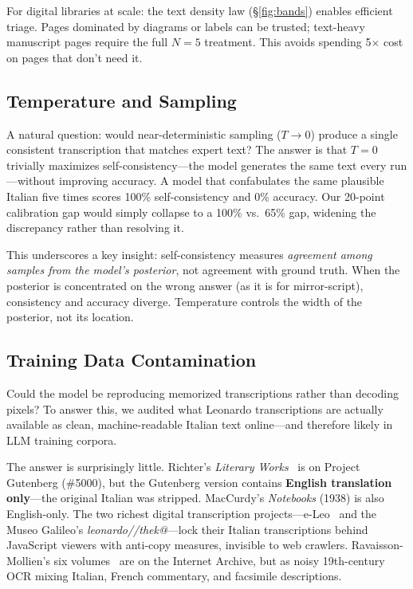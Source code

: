 \documentclass[10pt,twocolumn]{article}
\begin{document}
For digital libraries at scale: the text density law (\S\ref{fig:bands}) enables efficient triage. Pages dominated by diagrams or labels can be trusted; text-heavy manuscript pages require the full $N{=}5$ treatment. This avoids spending 5$\times$ cost on pages that don't need it.

\subsection{Temperature and Sampling}

A natural question: would near-deterministic sampling ($T \to 0$) produce a single consistent transcription that matches expert text? The answer is that $T{=}0$ trivially maximizes self-consistency---the model generates the same text every run---without improving accuracy. A model that confabulates the same plausible Italian five times scores 100\% self-consistency and 0\% accuracy. Our 20-point calibration gap would simply collapse to a 100\% vs.\ 65\% gap, widening the discrepancy rather than resolving it.

This underscores a key insight: self-consistency measures \emph{agreement among samples from the model's posterior}, not agreement with ground truth. When the posterior is concentrated on the wrong answer (as it is for mirror-script), consistency and accuracy diverge. Temperature controls the width of the posterior, not its location.

\subsection{Training Data Contamination}

Could the model be reproducing memorized transcriptions rather than decoding pixels? To answer this, we audited what Leonardo transcriptions are actually available as clean, machine-readable Italian text online---and therefore likely in LLM training corpora.

The answer is surprisingly little. Richter's \emph{Literary Works}~\cite{richter1883} is on Project Gutenberg (\#5000), but the Gutenberg version contains \textbf{English translation only}---the original Italian was stripped. MacCurdy's \emph{Notebooks} (1938) is also English-only. The two richest digital transcription projects---e-Leo~\cite{eleo} and the Museo Galileo's \emph{leonardo//thek@}---lock their Italian transcriptions behind JavaScript viewers with anti-copy measures, invisible to web crawlers. Ravaisson-Mollien's six volumes~\cite{ravaisson1881} are on the Internet Archive, but as noisy 19th-century OCR mixing Italian, French commentary, and facsimile descriptions.
\end{document}

